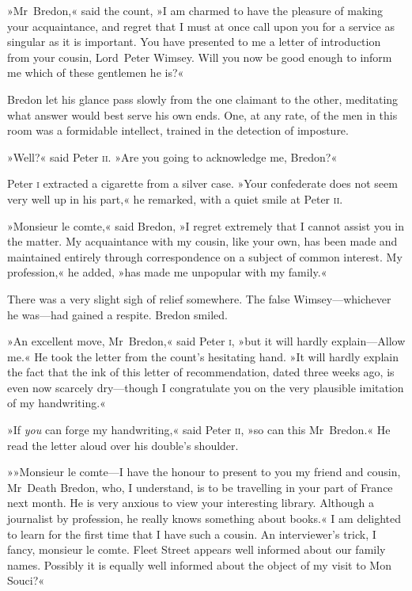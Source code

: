 »Mr~Bredon,« said the count, »I am charmed to have the pleasure of making your acquaintance, and regret that I must at once call upon you for a service as singular as it is important. You have presented to me a letter of introduction from your cousin, Lord~Peter Wimsey. Will you now be good enough to inform me which of these gentlemen he is?«

Bredon let his glance pass slowly from the one claimant to the other, meditating what answer would best serve his own ends. One, at any rate, of the men in this room was a formidable intellect, trained in the detection of imposture.

»Well?« said Peter \textsc{ii}. »Are you going to acknowledge me, Bredon?«

Peter \textsc{i} extracted a cigarette from a silver case. »Your confederate does not seem very well up in his part,« he remarked, with a quiet smile at Peter \textsc{ii}.

»Monsieur le comte,« said Bredon, »I regret extremely that I cannot assist you in the matter. My acquaintance with my cousin, like your own, has been made and maintained entirely through correspondence on a subject of common interest. My profession,« he added, »has made me unpopular with my family.«

There was a very slight sigh of relief somewhere. The false Wimsey—whichever he was—had gained a respite. Bredon smiled.

»An excellent move, Mr~Bredon,« said Peter \textsc{i}, »but it will hardly explain—Allow me.« He took the letter from the count's hesitating hand. »It will hardly explain the fact that the ink of this letter of recommendation, dated three weeks ago, is even now scarcely dry—though I congratulate you on the very plausible imitation of my handwriting.«

»If \textit{you} can forge my handwriting,« said Peter \textsc{ii}, »so can this Mr~Bredon.« He read the letter aloud over his double's shoulder.

»»Monsieur le comte—I have the honour to present to you my friend and cousin, Mr~Death Bredon, who, I understand, is to be travelling in your part of France next month. He is very anxious to view your interesting library. Although a journalist by profession, he really knows something about books.« I am delighted to learn for the first time that I have such a cousin. An interviewer's trick, I fancy, monsieur le comte. Fleet Street appears well informed about our family names. Possibly it is equally well informed about the object of my visit to Mon Souci?«

